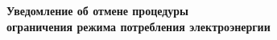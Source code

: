\vspace{5mm}
\begin{center}
	\Large\textbf{Уведомление об отмене процедуры\\
		ограничения режима потребления электроэнергии}
\end{center}
\par
\vspace{5mm}





